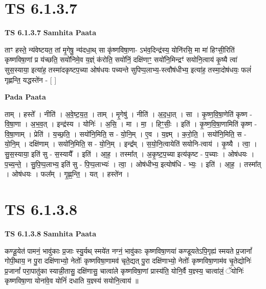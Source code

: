 \documentclass[17pt]{extarticle}
\begin{document}
\section*{ TS 6.1.3.7 }

\textbf{TS 6.1.3.7 } \newline
\textbf{Samhita Paata} \newline

ताꣳ हस्ते॒ न्य॑वेष्टयत॒ तां मृ॒गेषु॒ न्य॑दधा॒थ् सा कृ॑ष्णविषा॒णा- ऽभ॑व॒दिन्द्र॑स्य॒ योनि॑रसि॒ मा मा॑ हिꣳसी॒रिति॑ कृष्णविषा॒णां प्र य॑च्छति॒ सयो॑निमे॒व य॒ज्ञ्ं क॑रोति॒ सयो॑निं॒ दक्षि॑णाꣳ॒॒ सयो॑नि॒मिन्द्रꣳ॑ सयोनि॒त्वाय॑ कृ॒ष्यै त्वा॑ सुस॒स्याया॒ इत्या॑ह॒ तस्मा॑दकृष्टप॒च्या ओष॑धयः पच्यन्ते सुपिप्प॒लाभ्य॒-स्त्वौष॑धीभ्य॒ इत्या॑ह॒ तस्मा॒दोष॑धयः॒ फलं॑ गृह्णन्ति॒ यद्धस्ते॑न - [  ] \newline

\textbf{Pada Paata} \newline

ताम् । हस्ते᳚ । नीति॑ । अ॒वे॒ष्ट॒य॒त॒ । ताम् । मृ॒गेषु॑ । नीति॑ । अ॒द॒धा॒त् । सा । कृ॒ष्ण॒वि॒षा॒णेति॑ कृष्ण - वि॒षा॒णा । अ॒भ॒व॒त् । इन्द्र॑स्य । योनिः॑ । अ॒सि॒ । मा । मा॒ । हिꣳ॒॒सीः॒ । इति॑ । कृ॒ष्ण॒वि॒षा॒णामिति॑ कृष्ण - वि॒षा॒णाम् । प्रेति॑ । य॒च्छ॒ति॒ । सयो॑नि॒मिति॒ स - यो॒नि॒म् । ए॒व । य॒ज्ञ्म् । क॒रो॒ति॒ । सयो॑नि॒मिति॒ स - यो॒नि॒म् । दक्षि॑णाम् । सयो॑नि॒मिति॒ स - यो॒नि॒म् । इन्द्र᳚म् । स॒यो॒नि॒त्वायेति॑ सयोनि-त्वाय॑ । कृ॒ष्यै । त्वा॒ । सु॒स॒स्याया॒ इति॑ सु - स॒स्यायै᳚ । इति॑ । आ॒ह॒ । तस्मा᳚त् । अ॒कृ॒ष्ट॒प॒च्या इत्य॑कृष्ट - प॒च्याः । ओष॑धयः । प॒च्य॒न्ते॒ । सु॒पि॒प्प॒लाभ्य॒ इति॑ सु - पि॒प्प॒लाभ्यः॑ । त्वा॒ । ओष॑धीभ्य॒ इत्योष॑धि - भ्यः॒ । इति॑ । आ॒ह॒ । तस्मा᳚त् । ओष॑धयः । फल᳚म् । गृ॒ह्ण॒न्ति॒ । यत् । हस्ते॑न ।  \newline




\section*{ TS 6.1.3.8 }

\textbf{TS 6.1.3.8 } \newline
\textbf{Samhita Paata} \newline

कण्डू॒येत॑ पामनं॒ भावु॑काः प्र॒जाः स्यु॒र्यथ् स्मये॑त नग्नं॒ भावु॑काः कृष्णविषा॒णया॑ कण्डूयतेऽपि॒गृह्य॑ स्मयते प्र॒जानां᳚ गोपी॒थाय॒ न पु॒रा दक्षि॑णाभ्यो॒ नेतोः᳚ कृष्णविषा॒णामव॑ चृते॒द्यत् पु॒रा दक्षि॑णाभ्यो॒ नेतोः᳚ कृष्णविषा॒णाम॑व चृ॒तेद्योनिः॑ प्र॒जानां᳚ परा॒पातु॑का स्यान्नी॒तासु॒ दक्षि॑णासु॒ चात्वा॑ले कृष्णविषा॒णां प्रास्य॑ति॒ योनि॒र्वै य॒ज्ञ्स्य॒ चात्वा॑लं॒ ॅयोनिः॑ कृष्णविषा॒णा योना॑वे॒व योनिं॑ दधाति य॒ज्ञ्स्य॑ सयोनि॒त्वाय॑ ॥ \newline
\end{document}
